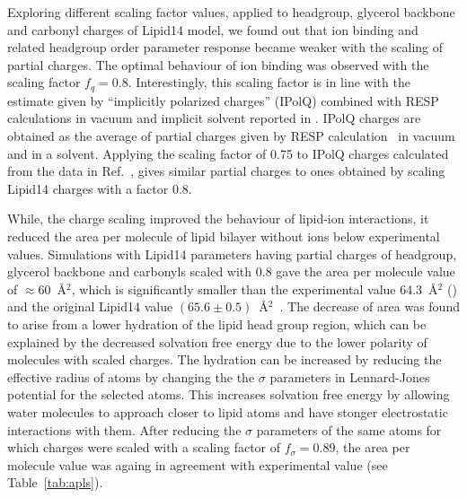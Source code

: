 \documentclass[aip,jcp,twocolumn]{revtex4}
\begin{document}
Exploring different scaling factor values, applied to headgroup, glycerol backbone
and carbonyl charges of Lipid14 model, we found out that ion binding and
related headgroup order parameter response became weaker with the scaling of partial
charges. The optimal behaviour of ion binding was observed with
the scaling factor $f_q = 0.8$. %
Interestingly, this scaling factor is in line with the estimate
given by ``implicitly polarized charges'' (IPolQ) \cite{ipolq2013}
combined with RESP calculations in vacuum and implicit solvent reported
in \cite{maciejewski14}. IPolQ charges are obtained as the average of
partial charges given by RESP calculation~\cite{RESP_paper}
in vacuum and in a solvent. Applying the scaling factor of 0.75 to
IPolQ charges calculated from the data in Ref.~\cite{maciejewski14},
gives similar partial charges to ones obtained by scaling Lipid14 charges
with a factor 0.8.


While, the charge scaling improved the behaviour of lipid-ion interactions,
it reduced the area per molecule of lipid bilayer without ions below experimental
values. Simulations with Lipid14 parameters having partial charges of headgroup, glycerol
backbone and carbonyls scaled with 0.8 gave the area per molecule value of $\approx$60~\AA$^2$,
which is significantly smaller than the experimental value 64.3~\AA$^2$ (\cite{})
and the original Lipid14 value $(65.6 \pm 0.5)$~\AA$^2$~\cite{dickson14}.
The decrease of area was found to arise from a lower hydration of the lipid head group region,
which can be explained by the decreased solvation free energy due to the lower polarity
of molecules with scaled charges. The hydration can be increased
by reducing the effective radius of atoms by changing the 
the $\sigma$ parameters in Lennard-Jones potential for the selected atoms.
This increases solvation free energy by allowing water molecules to
approach closer to lipid atoms and have stonger electrostatic interactions with them.
After reducing the $\sigma$ parameters of the same atoms for which charges were scaled
with a scaling factor of $f_\sigma = 0.89$, the area per molecule value was
againg in agreement with experimental value (see Table~\ref{tab:apls}). 
\end{document}
